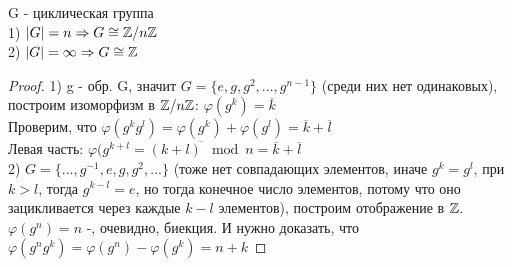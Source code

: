 \documentclass[12pt, fleqn]{article}
\begin{document}
\begin{theorem}
    G - циклическая группа\\
    1) $|G|=n \Rightarrow G \cong \mathbb{Z} / n \mathbb{Z}$\\
    2) $|G|=\infty \Rightarrow G \cong \mathbb{Z}$
\end{theorem}

\begin{proof}
    1) g - обр. G, значит $G=\{e,g,g^2,...,g^{n-1}\}$ (среди них нет одинаковых), построим изоморфизм в $\mathbb{Z} / n \mathbb{Z}$: $\varphi(g^k)=\overline{k}$\\
    Проверим, что $\varphi(g^k g^l)= \varphi(g^k)+\varphi(g^l)=\overline{k}+\overline{l}$\\
    Левая часть: $\varphi(g^{k+l}=\overline{(k+l) \mod n} = \overline{k}+\overline{l}$\\
    2) $G=\{...,g^{-1},e,g,g^2,...\}$ (тоже нет совпадающих элементов, иначе $g^k=g^l$, при $k>l$, тогда $g^{k-l}=e$, но тогда конечное число элементов, потому что оно зацикливается через каждые $k-l$ элементов), построим отображение в $\mathbb{Z}$.\\
    $\varphi(g^n)=n$ -, очевидно, биекция. И нужно доказать, что $\varphi(g^n g^k)=\varphi(g^n)-\varphi(g^k)=n+k$
\end{proof}
\end{document}
